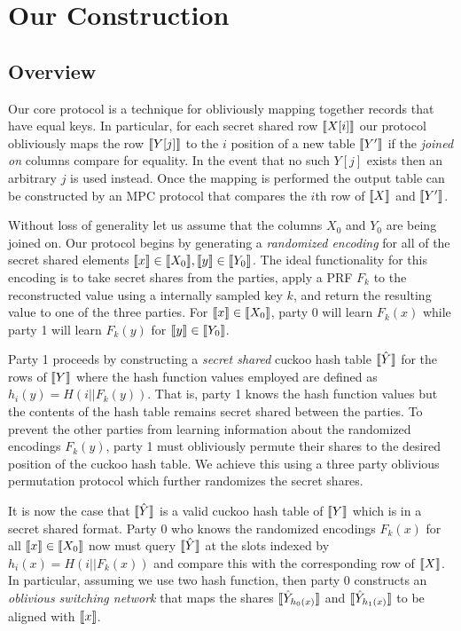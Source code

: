 \section{Our Construction}



\subsection{Overview}

Our core protocol is a technique for obliviously mapping together records that have equal keys. In particular, for each secret shared row $\llbracket X[i]\rrbracket$ our protocol obliviously maps the row $\llbracket Y[j]\rrbracket$ to the $i$ position of a new table $\llbracket Y'\rrbracket$ if the \emph{joined on} columns compare for equality. In the event that no such $Y[j]$ exists then an arbitrary $j$ is used instead. Once the mapping is performed the output table can be constructed by an MPC protocol\cite{aby3} that compares the $i$th row of $\llbracket X\rrbracket$ and $\llbracket Y'\rrbracket$. 

Without loss of generality let us assume that the columns $X_0$ and $Y_0$ are being joined on. Our protocol begins by generating a \emph{randomized encoding} for all of the secret shared elements $\llbracket x\rrbracket\in \llbracket X_0\rrbracket, \llbracket y\rrbracket\in \llbracket Y_0\rrbracket$. The ideal functionality for this encoding is to take secret shares from the parties, apply a PRF $F_k$ to the reconstructed value using a internally sampled key $k$, and return the resulting value to one of the three parties. For $\llbracket x\rrbracket\in \llbracket X_0\rrbracket$, party 0 will learn $F_k(x)$ while party 1 will learn $F_k(y)$ for $\llbracket y\rrbracket\in \llbracket Y_0\rrbracket$.

Party 1 proceeds by constructing a \emph{secret shared} cuckoo hash table $\llbracket \hat Y\rrbracket$ for the rows of $\llbracket Y\rrbracket$ where the hash function values employed are defined as $h_i(y) = H( i || F_k(y))$. That is, party 1 knows the hash function values but the contents of the hash table remains secret shared between the parties. To prevent the other parties from learning information about the randomized encodings $F_k(y)$, party 1 must obliviously permute their shares to the desired position of the cuckoo hash table. We achieve this using a three party oblivious permutation protocol which further randomizes the secret shares.

It is now the case that $\llbracket \hat Y\rrbracket$ is a valid cuckoo hash table of $\llbracket Y\rrbracket$ which is in a secret shared format. Party 0 who knows the randomized encodings $F_k(x)$ for all $\llbracket x\rrbracket\in \llbracket X_0\rrbracket$ now must query $\llbracket \hat Y\rrbracket$ at the slots indexed by $h_i(x)= H( i || F_k(x))$ and compare this with the corresponding row of $\llbracket X\rrbracket$. In particular, assuming we use two hash function, then party 0 constructs an \emph{oblivious switching network} that maps the shares $\llbracket \hat Y_{h_0(x)}\rrbracket$ and $\llbracket \hat Y_{h_1(x)}\rrbracket$ to be aligned with $\llbracket x\rrbracket$.

